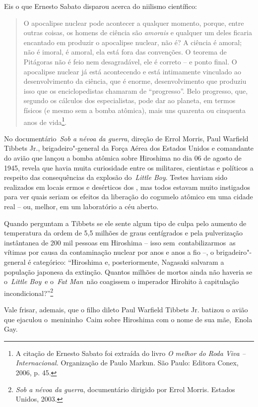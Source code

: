 Eis o que Ernesto Sabato disparou acerca do niilismo científico:

\begin{quote}
O apocalipse nuclear pode acontecer a qualquer momento, porque, entre
outras coisas, os homens de ciência são \emph{amorais} e qualquer um
deles ficaria encantado em produzir o apocalipse nuclear, não é? A
ciência é amoral; não é imoral, é amoral, ela está fora das convenções.
O teorema de Pitágoras não é feio nem desagradável, ele é correto -- e
ponto final. O apocalipse nuclear já está acontecendo e está intimamente
vinculado ao desenvolvimento da ciência, que é enorme, desenvolvimento
que produziu isso que os enciclopedistas chamaram de ``progresso''. Belo
progresso, que, segundo os cálculos dos especialistas, pode dar ao
planeta, em termos físicos (e mesmo sem a bomba atômica), mais uns
quarenta ou cinquenta anos de vida\footnote{A citação de Ernesto Sabato
  foi extraída do livro \emph{O melhor do Roda Viva -- Internacional.}
  Organização de Paulo Markun. São Paulo: Editora Conex, 2006, p. 45.}.
\end{quote}

No documentário~\emph{Sob a névoa da guerra}, direção de Errol Morris,
Paul Warfield Tibbets Jr., brigadeiro"-general da Força Aérea dos Estados
Unidos e comandante do avião que lançou a bomba atômica sobre Hiroshima
no dia 06 de agosto de 1945, revela que havia muita curiosidade entre os
militares, cientistas e políticos a respeito das consequências da
explosão do~\emph{Little Boy}. Testes haviam sido realizados em locais
ermos e desérticos dos , mas todos estavam muito instigados para ver
quais seriam os efeitos da liberação do cogumelo atômico em uma cidade
real -- ou, melhor, em um laboratório a céu aberto.

Quando perguntam a Tibbets se ele sente algum tipo de culpa pelo aumento
de temperatura da ordem de 5,5 milhões de graus centígrados e pela
pulverização instântanea de 200 mil pessoas em Hiroshima -- isso
sem~contabilizarmos~as vítimas por causa da contaminação nuclear por
anos e anos a fio --, o brigadeiro"-general é categórico: ``Hiroshima e,
posteriormente, Nagasaki salvaram a população japonesa da extinção.
Quantos milhões de mortos ainda não haveria se o~\emph{Little Boy}~e
o~\emph{Fat Man}~não coagissem o imperador Hirohito à capitulação
incondicional?''\footnote{\emph{Sob a névoa da guerra}, documentário
  dirigido por Errol Morris. Estados Unidos, 2003.}

Vale frisar, ademais, que o filho dileto Paul Warfield Tibbets Jr.
batizou o avião que ejaculou o~menininho~Caim sobre Hiroshima com o nome
de sua mãe,~Enola Gay.

